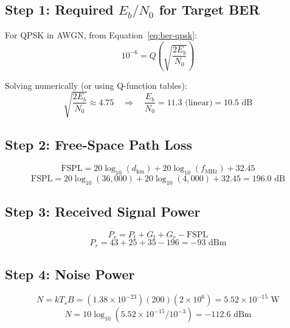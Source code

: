 \subsection*{Step 1: Required $E_b/N_0$ for Target BER}

For QPSK in AWGN, from Equation~\ref{eq:ber-qpsk}:
\begin{equation}
10^{-6} = Q\left(\sqrt{\frac{2E_b}{N_0}}\right)
\end{equation}

Solving numerically (or using Q-function tables):
\begin{equation}
\sqrt{\frac{2E_b}{N_0}} \approx 4.75 \quad \Rightarrow \quad \frac{E_b}{N_0} = 11.3 \text{ (linear)} = 10.5 \text{ dB}
\end{equation}

\subsection*{Step 2: Free-Space Path Loss}

\begin{equation}
\mathrm{FSPL} = 20\log_{10}(d_{\text{km}}) + 20\log_{10}(f_{\text{MHz}}) + 32.45
\end{equation}
\begin{equation}
\mathrm{FSPL} = 20\log_{10}(36{,}000) + 20\log_{10}(4{,}000) + 32.45 = 196.0 \text{ dB}
\end{equation}

\subsection*{Step 3: Received Signal Power}

\begin{equation}
P_r = P_t + G_t + G_r - \mathrm{FSPL}
\end{equation}
\begin{equation}
P_r = 43 + 25 + 35 - 196 = -93 \text{ dBm}
\end{equation}

\subsection*{Step 4: Noise Power}

\begin{equation}
N = kT_sB = (1.38 \times 10^{-23})(200)(2 \times 10^6) = 5.52 \times 10^{-15} \text{ W}
\end{equation}
\begin{equation}
N = 10\log_{10}(5.52 \times 10^{-15} / 10^{-3}) = -112.6 \text{ dBm}
\end{equation}

